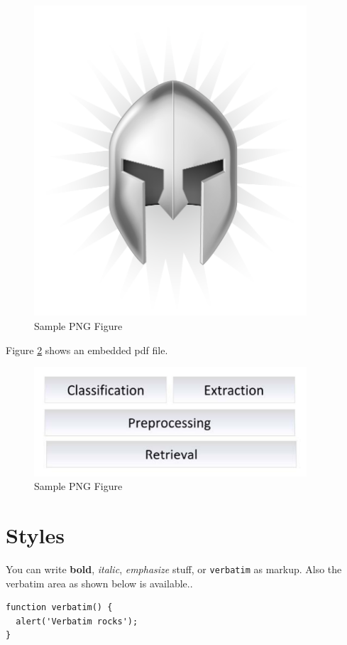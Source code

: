 \documentclass[a4paper,twoside]{book}      %
\begin{document}
\begin{figure}
\centering
\includegraphics[width=4in]{pngFigure.png}
\caption{Sample PNG Figure}
\label{fig:samplePng}
\end{figure}

Figure \ref{fig:samplePdf} shows an embedded pdf file.
 
\begin{figure}
\centering
\includegraphics[width=4in]{pdfFigure.pdf}
\caption{Sample PNG Figure}
\label{fig:samplePdf}
\end{figure}

\section{Styles}
You can write \textbf{bold}, \textit{italic}, \emph{emphasize} stuff, or \verb#verbatim# as markup. Also the verbatim area as shown below is available..

\begin{verbatim}
function verbatim() {
  alert('Verbatim rocks');
}
\end{verbatim}
\end{document}
